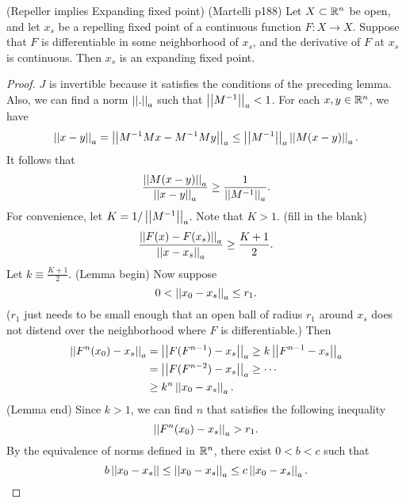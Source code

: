 \documentclass[11pt]{book}
\begin{document}
\begin{proposition}
  (Repeller implies Expanding fixed point)
  (Martelli p188)
  Let $X \subset \mathbb{R}^n$ be open, and let $x_s$ be a repelling fixed point
  of a continuous function $F: X \to X$. Suppose that $F$ is
  differentiable in some neighborhood of $x_s$, and the derivative of $F$ at $x_s$ is continuous.
  Then $x_s$ is an expanding fixed point.
\end{proposition}
\begin{proof}
  $J$ is invertible because it satisfies the conditions of the preceding lemma.
  Also, we can find a norm $\left|\left|.\right|\right|_a$ such that $\left|\left|M^{-1}\right|\right|_a < 1$.
  For each $x, y \in \mathbb{R}^n$, we have 
  \begin{equation*}
    \left|\left|x-y\right|\right|_a = \left|\left|M^{-1} M x - M^{-1} M y\right|\right|_a \leq \left|\left|M^{-1}\right|\right|_a \left|\left|M(x - y)\right|\right|_a.
  \end{equation*}
  It follows that 
  \begin{equation*}
    \frac{\left|\left|M(x-y)\right|\right|_a}{\left|\left|x-y\right|\right|_a} \geq \frac{1}{\left|\left|M^{-1}\right|\right|_a}.
  \end{equation*}
  For convenience, let $K = 1/\left|\left|M^{-1}\right|\right|_a$.
  Note that $K > 1$.
  (fill in the blank)
  \begin{equation*}
    \frac{\left|\left|F(x) - F(x_s)\right|\right|_a}{\left|\left|x - x_s\right|\right|_a} \geq \frac{K+1}{2}.
  \end{equation*}
  Let $k \equiv \frac{K+1}{2}$.
  (Lemma begin) Now suppose
  \begin{equation*}
    0 < \left|\left|x_0 - x_s\right|\right|_a \leq r_1.
  \end{equation*}
  ($r_1$ just needs to be small enough that an open ball
  of radius $r_1$ around $x_s$ does not distend over the
  neighborhood where $F$ is differentiable.) Then
  \begin{align*}
    \left|\left|F^n(x_0) - x_s\right|\right|_a &= \left|\left|F(F^{n-1}) - x_s\right|\right|_a \geq k \left|\left|F^{n-1} - x_s\right|\right|_a     \\
    &= \left|\left|F(F^{n-2}) - x_s\right|\right|_a \geq \cdots \\
    &\geq k^n \left|\left|x_0 - x_s\right|\right|_a.
  \end{align*}
  (Lemma end)
  Since $k > 1$, we can find $n$ that satisfies the following inequality
  \begin{equation*}
    \left|\left|F^n(x_0) - x_s\right|\right|_a > r_1.
  \end{equation*}
  By the equivalence of norms defined in $\mathbb{R}^n$, there exist $0 < b < c$ such that 
  \begin{equation*}
    b \norm{x_0 - x_s} \leq \norm{x_0 - x_s}_a \leq c \norm{x_0 - x_s}_a.

\end{equation*}
\end{proof}
\end{document}

